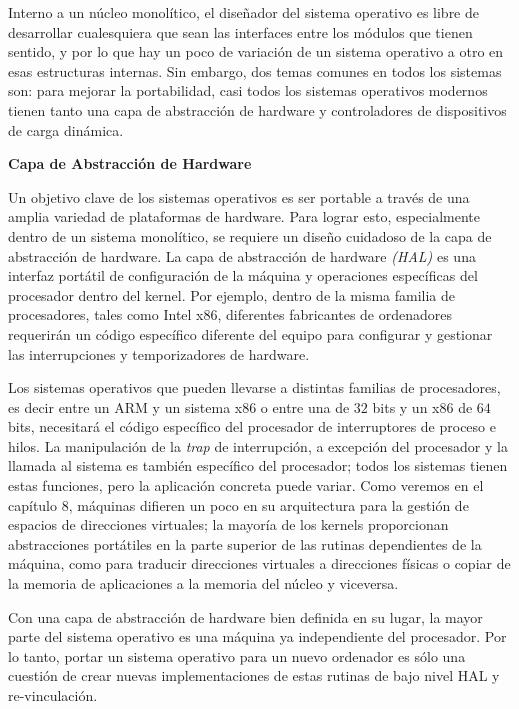 \documentclass[10pt]{book}
\begin{document}
Interno a un núcleo monolítico, el diseñador del sistema operativo es libre de desarrollar cualesquiera que sean las interfaces entre los módulos que tienen sentido, y por lo que hay un poco de variación de un sistema operativo a otro en esas estructuras internas. Sin embargo, dos temas comunes en todos los sistemas son: para mejorar la portabilidad, casi todos los sistemas operativos modernos tienen tanto una capa de abstracción de hardware y controladores de dispositivos de carga dinámica.

\setlength{\parindent}{20pt} \textbf{Capa de Abstracción de Hardware} \setlength{\parindent}{0pt}

Un objetivo clave de los sistemas operativos es ser portable a través de una amplia variedad de plataformas de hardware. Para lograr esto, especialmente dentro de un sistema monolítico, se requiere un diseño cuidadoso de la capa de abstracción de hardware. La capa de abstracción de hardware \textit{(HAL)} es una interfaz portátil de configuración de la máquina y operaciones específicas del procesador dentro del kernel. Por ejemplo, dentro de la misma familia de procesadores, tales como Intel x$86$, diferentes fabricantes de ordenadores requerirán un código específico diferente del equipo para configurar y gestionar las interrupciones y temporizadores de hardware.

Los sistemas operativos que pueden llevarse a distintas familias de procesadores, es decir entre un ARM y un sistema x$86$ o entre una de $32$ bits y un x$86$ de $64$ bits, necesitará el código específico del procesador de interruptores de proceso e hilos. La manipulación de la \textit{trap} de interrupción, a excepción del procesador y la llamada al sistema es también específico del procesador; todos los sistemas tienen estas funciones, pero la aplicación concreta puede variar. Como veremos en el capítulo 8, máquinas difieren un poco en su arquitectura para la gestión de espacios de direcciones virtuales; la mayoría de los kernels proporcionan abstracciones portátiles en la parte superior de las rutinas dependientes de la máquina, como para traducir direcciones virtuales a direcciones físicas o copiar de la memoria de aplicaciones a la memoria del núcleo y viceversa.

Con una capa de abstracción de hardware bien definida en su lugar, la mayor parte del sistema operativo es una máquina ya independiente del procesador. Por lo tanto, portar un sistema operativo para un nuevo ordenador es sólo una cuestión de crear nuevas implementaciones de estas rutinas de bajo nivel HAL y re-vinculación.
\end{document}

